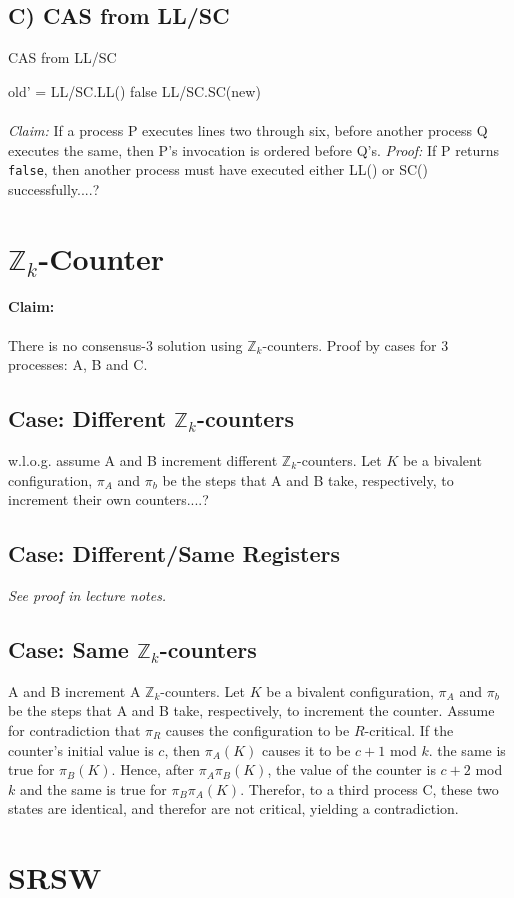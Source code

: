 \documentclass[11pt]{article}
\begin{document}
\subsection*{C) CAS from LL/SC} 
\begin{algorithm}
    \caption{CAS from LL/SC}
    \begin{algorithmic}[1]
            \State old' = LL/SC.LL()
                \State \Return false
            \Else
                \State \Return LL/SC.SC(new)
            \EndIf
        \EndFunction
    \end{algorithmic}
\end{algorithm}
\paragraph{} \textit{Claim:} If a process P executes lines two through six, before another process Q executes the same, then P's invocation is ordered before Q's. \textit{Proof:} If P returns \texttt{false}, then another process must have executed either LL() or SC() successfully....?

\section{$\mathbb{Z}_k$-Counter}
\paragraph{Claim:} There is no consensus-3 solution using $\mathbb{Z}_k$-counters.
Proof by cases for 3 processes: A, B and C.
\subsection{Case: Different $\mathbb{Z}_k$-counters}
    w.l.o.g. assume A and B increment different $\mathbb{Z}_k$-counters. Let $K$ be a bivalent configuration, $\pi_A$ and $\pi_b$ be the steps that A and B take, respectively, to increment their own counters....?
\subsection{Case: Different/Same Registers} 
    \textit{See proof in lecture notes.}
\subsection{Case: Same $\mathbb{Z}_k$-counters}
    A and B increment A $\mathbb{Z}_k$-counters. Let $K$ be a bivalent configuration, $\pi_A$ and $\pi_b$ be the steps that A and B take, respectively, to increment the counter. Assume for contradiction that $\pi_R$ causes the configuration to be $R$-critical. If the counter's initial value is $c$, then $\pi_A(K)$ causes it to be $c+1$ mod $k$. the same is true for $\pi_B(K)$. Hence, after $\pi_A\pi_B(K)$, the value of the counter is $c+2$ mod $k$ and the same is true for $\pi_B\pi_A(K)$. Therefor, to a third process C, these two states are identical, and therefor are not critical, yielding a contradiction.

\section{SRSW}
\end{document}
